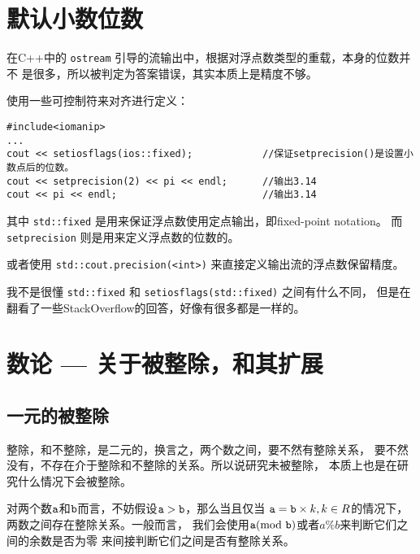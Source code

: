 

\section{默认小数位数}

\def\vb|#1|{ \verb|#1| }

在C++中的\vb|ostream|引导的流输出中，根据对浮点数类型的重载，本身的位数并不
是很多，所以被判定为答案错误，其实本质上是精度不够。

使用一些可控制符来对齐进行定义：
\begin{lstlisting}
#include<iomanip>
...
cout << setiosflags(ios::fixed);            //保证setprecision()是设置小数点后的位数。
cout << setprecision(2) << pi << endl;      //输出3.14
cout << pi << endl;                         //输出3.14
\end{lstlisting}

其中\vb|std::fixed|是用来保证浮点数使用定点输出，即fixed-point notation。
而\vb|setprecision|则是用来定义浮点数的位数的。

或者使用\vb|std::cout.precision(<int>)|来直接定义输出流的浮点数保留精度。

我不是很懂\vb|std::fixed|和\vb|setiosflags(std::fixed)|之间有什么不同，
但是在翻看了一些StackOverflow的回答，好像有很多都是一样的。


\section{数论 --- 关于被整除，和其扩展}

\subsection{一元的被整除}

整除，和不整除，是二元的，换言之，两个数之间，要不然有整除关系，
要不然没有，不存在介于整除和不整除的关系。所以说研究未被整除，
本质上也是在研究什么情况下会被整除。

\def\a{\text{\tt a}}
\def\b{\text{\tt b}}
\def\mod{\text{mod }}
\def\floor#1{\lfloor{#1}\rfloor}
\def\ceil#1{\lceil{#1}\rceil}
\def\lcm{\text{lcm}}

对两个数$\a$和$\b$而言，不妨假设$\a > \b$，那么当且仅当
$\a = \b\times k, k\in R$的情况下，两数之间存在整除关系。一般而言，
我们会使用$\a (\mod \b)$或者$a\%b$来判断它们之间的余数是否为零
来间接判断它们之间是否有整除关系。

